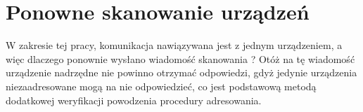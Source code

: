 \section{Ponowne skanowanie urządzeń}
W zakresie tej pracy, komunikacja nawiązywana jest z jednym urządzeniem, a więc dlaczego
ponownie wysłano wiadomość skanowania ? Otóż na tę wiadomość urządzenie nadrzędne
nie powinno otrzymać odpowiedzi, gdyż jedynie urządzenia niezaadresowane mogą na nie 
odpowiedzieć, co jest podstawową metodą dodatkowej weryfikacji powodzenia procedury
adresowania.
